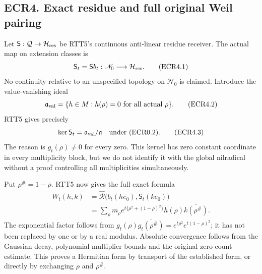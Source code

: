 \subsection{ECR4. Exact residue and full original Weil
pairing}\label{ecr4.-exact-residue-and-full-original-weil-pairing}

Let \(\mathsf S:\mathcal Q\to\mathcal H_{\rm res}\) be RTT5's continuous
anti-linear residue receiver. The actual map on extension classes is \[
\mathsf S_t=\mathsf S b_t:\mathscr N_0\longrightarrow\mathcal H_{\rm res}.
\tag{ECR4.1}
\] No continuity relative to an unspecified topology on \(\mathscr N_0\)
is claimed. Introduce the value-vanishing ideal \[
\mathfrak a_{\rm val}=\{h\in M:h(\rho)=0\text{ for all actual }\rho\}.
\tag{ECR4.2}
\] RTT5 gives precisely \[
\ker\mathsf S_t=\mathfrak a_{\rm val}/\mathfrak a
\quad\text{under (ECR0.2)}.
\tag{ECR4.3}
\] The reason is \(g_t(\rho)\ne0\) for every zero. This kernel has zero
constant coordinate in every multiplicity block, but we do not identify
it with the global nilradical without a proof controlling all
multiplicities simultaneously.

Put \(\rho^\#=1-\overline\rho\). RTT5 now gives the full exact formula
\[
\begin{aligned}
W_t(h,k)
&=\widehat{\mathcal R}\bigl(b_t(h e_0),\mathsf S_t(k e_0)\bigr)\\
&=\sum_\rho m_\rho
e^{t\{\rho^2+(1-\rho)^2\}}
h(\rho)\overline{k(\rho^\#)}.
\end{aligned}
\tag{ECR4.4}
\] The exponential factor follows from
\(g_t(\rho)\overline{g_t(\rho^\#)}=e^{t\rho^2}e^{t(1-\rho)^2}\); it has
not been replaced by one or by a real modulus. Absolute convergence
follows from the Gaussian decay, polynomial multiplier bounds and the
original zero-count estimate. This proves a Hermitian form by transport
of the established form, or directly by exchanging \(\rho\) and
\(\rho^\#\).

